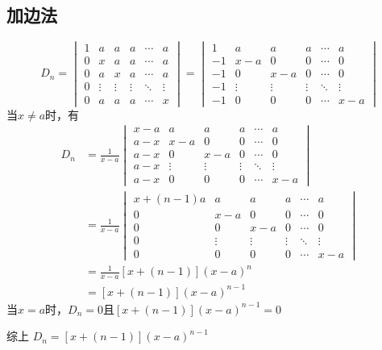 \subsection{加边法}
\begin{solution}
    \[
        D_n =
        \begin{vmatrix}
            1 & a      & a      & a      & \cdots & a      \\
            0 & x      & a      & a      & \cdots & a      \\
            0 & a      & x      & a      & \cdots & a      \\
            0 & \vdots & \vdots & \vdots & \ddots & \vdots \\
            0 & a      & a      & a      & \cdots & x
        \end{vmatrix}
        =
        \begin{vmatrix}
            1  & a      & a      & a      & \cdots & a      \\
            -1 & x-a    & 0      & 0      & \cdots & 0      \\
            -1 & 0      & x-a    & 0      & \cdots & 0      \\
            -1 & \vdots & \vdots & \vdots & \ddots & \vdots \\
            -1 & 0      & 0      & 0      & \cdots & x-a
        \end{vmatrix}
    \]
    当$x\neq a$时，有
    \begin{align*}
        D_n & = \frac{1}{x-a}
        \begin{vmatrix}
            x-a & a      & a      & a      & \cdots & a      \\
            a-x & x-a    & 0      & 0      & \cdots & 0      \\
            a-x & 0      & x-a    & 0      & \cdots & 0      \\
            a-x & \vdots & \vdots & \vdots & \ddots & \vdots \\
            a-x & 0      & 0      & 0      & \cdots & x-a
        \end{vmatrix}             \\
            & = \frac{1}{x-a}
        \begin{vmatrix}
            x+(n-1)a & a      & a      & a      & \cdots & a      \\
            0        & x-a    & 0      & 0      & \cdots & 0      \\
            0        & 0      & x-a    & 0      & \cdots & 0      \\
            0        & \vdots & \vdots & \vdots & \ddots & \vdots \\
            0        & 0      & 0      & 0      & \cdots & x-a
        \end{vmatrix}             \\
            & = \frac{1}{x-a} [x+(n-1)](x-a)^n \\
            & = [x+(n-1)](x-a)^{n-1}
    \end{align*}
    当$x=a$时，$D_n=0$且$[x+(n-1)](x-a)^{n-1}=0$

    综上
    $D_n = [x+(n-1)](x-a)^{n-1}$
\end{solution}